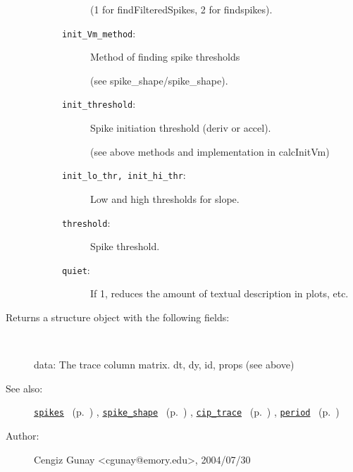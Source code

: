 \begin{description}
\begin{description}
\begin{description}
(1 for findFilteredSpikes, 2 for findspikes).\item[\texttt{init\_Vm\_method}:]
 Method of finding spike thresholds 

(see spike\_shape/spike\_shape).\item[\texttt{init\_threshold}:]
 Spike initiation threshold (deriv or accel).

(see above methods and implementation in calcInitVm)\item[\texttt{init\_lo\_thr, init\_hi\_thr}:]
 Low and high thresholds for slope.
\item[\texttt{threshold}:]
 Spike threshold.
\item[\texttt{quiet}:]
 If 1, reduces the amount of textual description in plots, etc.
\end{description}%
\end{description}%
%
\item[Returns a structure object with the following fields:]~

	data: The trace column matrix.
	dt, dy, id, props (see above)
%
%
\item[See also:]%
\hyperlink{ref_spikes}{\texttt{spikes}}%
\ (p.~\pageref{ref_spikes})%
%
, \hyperlink{ref_spike_shape}{\texttt{spike\_shape}}%
\ (p.~\pageref{ref_spike_shape})%
%
, \hyperlink{ref_cip_trace}{\texttt{cip\_trace}}%
\ (p.~\pageref{ref_cip_trace})%
%
, \hyperlink{ref_period}{\texttt{period}}%
\ (p.~\pageref{ref_period})%
%
%
\item[Author:]%
Cengiz Gunay <cgunay@emory.edu>, 2004/07/30%
\end{description}
\methodline%
